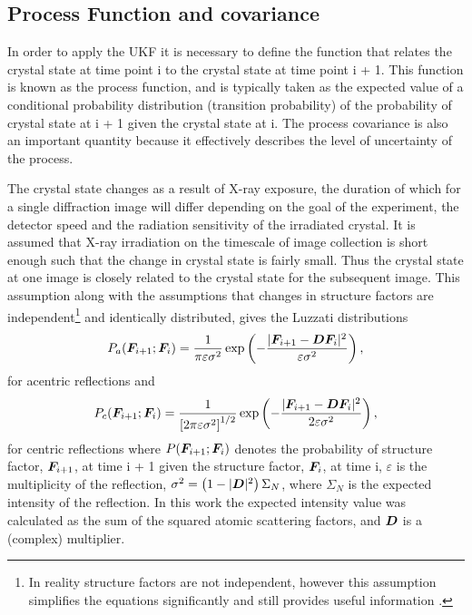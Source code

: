 \subsection{Process Function and covariance}
\label{sub:Process Function and covariance}
In order to apply the UKF it is necessary to define the function that relates the crystal state at time point i to the crystal state at time point i + 1.
This function is known as the process function, and is typically taken as the expected value of a conditional probability distribution (transition probability) of the probability of crystal state at i + 1 given the crystal state at i.
The process covariance is also an important quantity because it effectively describes the level of uncertainty of the process.

The crystal state changes as a result of X-ray exposure, the duration of which for a single diffraction image will differ depending on the goal of the experiment, the detector speed and the radiation sensitivity of the irradiated crystal.
It is assumed that X-ray irradiation on the timescale of image collection is short enough such that the change in crystal state is fairly small.
Thus the crystal state at one image is closely related to the crystal state for the subsequent image.
This assumption along with the assumptions that changes in structure factors are independent\footnote{In reality structure factors are not independent, however this assumption simplifies the equations significantly and still provides useful information \cite{pannu1996improved}.} and identically distributed, gives the Luzzati distributions \cite{luzzati1952traitement,read1990structure,pannu1996improved}
\begin{equation}
    P_a(\boldsymbol{F}_{i+1} ; \boldsymbol{F}_i) = \frac{1}{\pi \varepsilon \sigma^2} \exp \left(-\frac{|\boldsymbol{F}_{i+1} - \boldsymbol{D}\boldsymbol{F}_i|^2}{\varepsilon \sigma^2}\right),
    \label{eq:Luzzati distribution for acentric reflections}
\end{equation}
for acentric reflections and
\begin{equation}
    P_c(\boldsymbol{F}_{i+1} ; \boldsymbol{F}_i) = \frac{1}{\left[ 2 \pi \varepsilon \sigma^2 \right]^{1/2}} \exp \left(-\frac{|\boldsymbol{F}_{i+1} - \boldsymbol{D}\boldsymbol{F}_i|^2}{2 \varepsilon \sigma^2}\right),
    \label{eq:Luzzati distribution for centric reflections}
\end{equation}
for centric reflections where $P(\boldsymbol{F}_{i+1} ; \boldsymbol{F}_i)$ denotes the probability of structure factor, $\boldsymbol{F}_{i+1}$, at time i + 1 given the structure factor, $\boldsymbol{F}_{i}$, at time i, $\varepsilon$ is the multiplicity of the reflection, $\sigma^2 = \left(1 - |\boldsymbol{D}|^2 \right)\Sigma_N$, where $\Sigma_N$ is the expected intensity of the reflection.
In this work the expected intensity value was calculated as the sum of the squared atomic scattering factors, and $\boldsymbol{D}$ is a (complex) multiplier.

